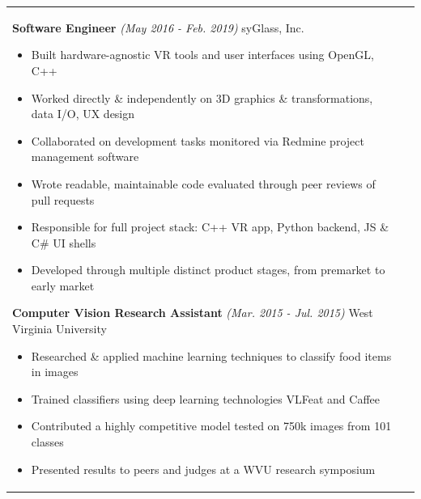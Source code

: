 \documentclass{article}
\begin{document}
\begin{tabular}{@{}p{2.5cm}@{\hspace{0.2cm}}p{13cm}@{}}
\textbf{Software Engineer}
\hfill\small\textit{(May 2016 - Feb. 2019)}\normalsize
\newline syGlass, Inc.
\par\vspace{0.15cm}\small
\begin{itemize}[leftmargin=*,nolistsep,noitemsep]
  \item[--]Built hardware-agnostic VR tools and user interfaces using OpenGL, C++
	\item[--]Worked directly \& independently on 3D graphics \& transformations, data I/O, UX design
	\item[--]Collaborated on development tasks monitored via Redmine project management software
	\item[--]Wrote readable, maintainable code evaluated through peer reviews of pull requests
	\item[--]Responsible for full project stack: C++ VR app, Python backend, JS \& C\# UI shells
  \item[--]Developed through multiple distinct product stages, from premarket to early market
\newline
\end{itemize}
\normalsize

\textbf{Computer Vision Research Assistant}
\hfill\small\textit{(Mar. 2015 - Jul. 2015)}\normalsize
\newline West Virginia University
\par\vspace{0.15cm}\small
\begin{itemize}[leftmargin=*, nolistsep,noitemsep]
  \item[--]Researched \& applied machine learning techniques to classify food items in images
  \item[--]Trained classifiers using deep learning technologies VLFeat and Caffee
	\item[--]Contributed a highly competitive model tested on 750k images from 101 classes
  \item[--]Presented results to peers and judges at a WVU research symposium
\end{itemize}
\normalsize \\



\end{tabular}
\end{document}
